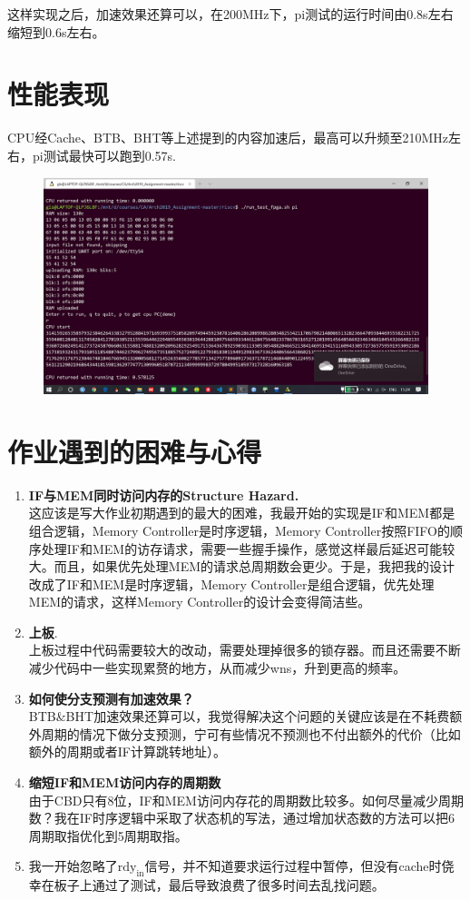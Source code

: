 \documentclass[a4paper,UTF8]{article}
\begin{document}
这样实现之后，加速效果还算可以，在200MHz下，pi测试的运行时间由0.8s左右缩短到0.6s左右。
\newpage
\section{性能表现}
CPU经Cache、BTB、BHT等上述提到的内容加速后，最高可以升频至210MHz左右，pi测试最快可以跑到0.57s.
\begin{figure}[h]
    \centering
	\includegraphics[width=1\linewidth]{5.png}
\end{figure}

\section{作业遇到的困难与心得}
\begin{enumerate}
    \item \textbf{IF与MEM同时访问内存的Structure Hazard.}\\
        这应该是写大作业初期遇到的最大的困难，我最开始的实现是IF和MEM都是组合逻辑，Memory Controller是时序逻辑，Memory Controller按照FIFO的顺序处理IF和MEM的访存请求，需要一些握手操作，感觉这样最后延迟可能较大。而且，如果优先处理MEM的请求总周期数会更少。于是，我把我的设计改成了IF和MEM是时序逻辑，Memory Controller是组合逻辑，优先处理MEM的请求，这样Memory Controller的设计会变得简洁些。
    \item \textbf{上板}.\\
    上板过程中代码需要较大的改动，需要处理掉很多的锁存器。而且还需要不断减少代码中一些实现累赘的地方，从而减少wns，升到更高的频率。
    \item \textbf{如何使分支预测有加速效果？}\\
    BTB\&BHT加速效果还算可以，我觉得解决这个问题的关键应该是在不耗费额外周期的情况下做分支预测，宁可有些情况不预测也不付出额外的代价（比如额外的周期或者IF计算跳转地址）。
    \item \textbf{缩短IF和MEM访问内存的周期数}\\
    由于CBD只有8位，IF和MEM访问内存花的周期数比较多。如何尽量减少周期数？我在IF时序逻辑中采取了状态机的写法，通过增加状态数的方法可以把6周期取指优化到5周期取指。
    \item 我一开始忽略了$\text{rdy}_\text{in}$信号，并不知道要求运行过程中暂停，但没有cache时侥幸在板子上通过了测试，最后导致浪费了很多时间去乱找问题。
\end{enumerate}
\end{document}
